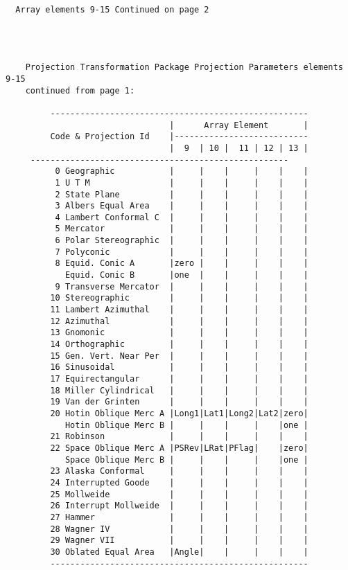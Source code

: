 \begin{verbatim}
  Array elements 9-15 Continued on page 2




    Projection Transformation Package Projection Parameters elements 9-15
    continued from page 1:

         ----------------------------------------------------
                                 |      Array Element       |
         Code & Projection Id    |---------------------------
                                 |  9  | 10 |  11 | 12 | 13 |
	 ----------------------------------------------------
          0 Geographic           |     |    |     |    |    |
          1 U T M                |     |    |     |    |    |
          2 State Plane          |     |    |     |    |    |
          3 Albers Equal Area    |     |    |     |    |    |
          4 Lambert Conformal C  |     |    |     |    |    |
          5 Mercator             |     |    |     |    |    |
          6 Polar Stereographic  |     |    |     |    |    |
          7 Polyconic            |     |    |     |    |    |
          8 Equid. Conic A       |zero |    |     |    |    |
            Equid. Conic B       |one  |    |     |    |    |
          9 Transverse Mercator  |     |    |     |    |    |
         10 Stereographic        |     |    |     |    |    |
         11 Lambert Azimuthal    |     |    |     |    |    |
         12 Azimuthal            |     |    |     |    |    |
         13 Gnomonic             |     |    |     |    |    |
         14 Orthographic         |     |    |     |    |    |
         15 Gen. Vert. Near Per  |     |    |     |    |    |
         16 Sinusoidal           |     |    |     |    |    |
         17 Equirectangular      |     |    |     |    |    |
         18 Miller Cylindrical   |     |    |     |    |    |
         19 Van der Grinten      |     |    |     |    |    |
         20 Hotin Oblique Merc A |Long1|Lat1|Long2|Lat2|zero|
            Hotin Oblique Merc B |     |    |     |    |one |
         21 Robinson             |     |    |     |    |    |
         22 Space Oblique Merc A |PSRev|LRat|PFlag|    |zero|
            Space Oblique Merc B |     |    |     |    |one |
         23 Alaska Conformal     |     |    |     |    |    |
         24 Interrupted Goode    |     |    |     |    |    |
         25 Mollweide            |     |    |     |    |    |
         26 Interrupt Mollweide  |     |    |     |    |    |
         27 Hammer               |     |    |     |    |    |
         28 Wagner IV            |     |    |     |    |    |
         29 Wagner VII           |     |    |     |    |    |
         30 Oblated Equal Area   |Angle|    |     |    |    |
         ----------------------------------------------------


\end{verbatim}
